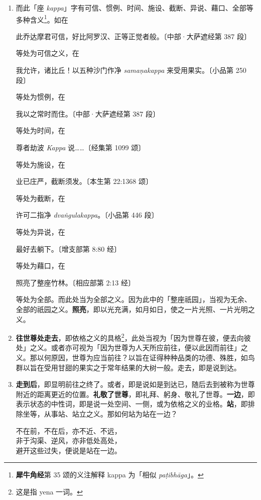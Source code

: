 \begin{enumerate}
\item 而此「座 \textit{kappa}」字有可信、惯例、时间、施设、截断、异说、藉口、全部等多种含义\footnote{\textbf{犀牛角经}第 35 颂的义注解释 kappa 为「相似 \textit{paṭibhāga}」。}。如在\begin{quoting}此乔达摩君可信，好比阿罗汉、正等正觉者般。{\bluefootnotesize 〔中部·大萨遮经第 387 段〕}\end{quoting}等处为可信之义，在\begin{quoting}我允许，诸比丘！以五种沙门作净 \textit{samaṇakappa} 来受用果实。{\bluefootnotesize 〔小品第 250 段〕}\end{quoting}等处为惯例，在\begin{quoting}我以之常时而住。{\bluefootnotesize 〔中部·大萨遮经第 387 段〕}\end{quoting}等处为时间，在\begin{quoting}尊者劫波 \textit{Kappa} 说……{\bluefootnotesize 〔经集第 1099 颂〕}\end{quoting}等处为施设，在\begin{quoting}业已庄严，截断须发。{\bluefootnotesize 〔本生第 22:1368 颂〕}\end{quoting}等处为截断，在\begin{quoting}许可二指净 \textit{dvaṅgulakappa}。{\bluefootnotesize 〔小品第 446 段〕}\end{quoting}等处为异说，在\begin{quoting}最好去躺下。{\bluefootnotesize 〔增支部第 8:80 经〕}\end{quoting}等处为藉口，在\begin{quoting}照亮了整座竹林。{\bluefootnotesize 〔相应部第 2:13 经〕}\end{quoting}等处为全部。而此处当为全部之义。因为此中的「整座祇园」，当视为无余、全部的祇园之义。\textbf{照亮}，即以光充满，如月如日，使之一片光照、一片光明之义。
\item \textbf{往世尊处走去}，即依格之义的具格\footnote{这是指 yena 一词。}，此处当视为「因为世尊在彼，便去向彼处」之义。或者亦可视为「因为世尊为人天所应前往，便以此因而前往」之义。那以何原因，世尊为应当前往？以旨在证得种种品类的功德、殊胜，如鸟群以旨在受用甘甜的果实之于常年结果的大树一般。走去，即是说到达。
\item \textbf{走到后}，即显明前往之终了。或者，即是说如是到达已，随后去到被称为世尊附近的距离更近的位置。\textbf{礼敬了世尊}，即礼拜、躬身、敬礼了世尊。\textbf{一边}，即表示状态的中性词，即是说一处空间、一侧，或为依格之义的业格。\textbf{站}，即排除坐等，从事站、站立之义。那如何站为站在一边？\begin{quoting}不在前，不在后，亦不近、不远，\\非于沟渠、逆风，亦非低处高处，\\避开这些过失，便说是站在一边。\end{quoting}

\end{enumerate}
